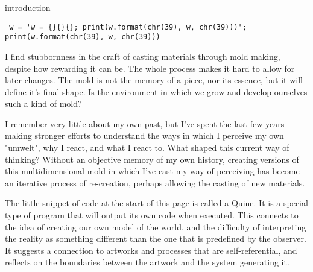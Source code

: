 
\begin{center}
\vspace*{\fill}
\Huge introduction

\vspace{2cm}

\begin{flushright}
\footnotesize 
\begin{verbatim}
 w = 'w = {}{}{}; print(w.format(chr(39), w, chr(39)))'; print(w.format(chr(39), w, chr(39)))
\end{verbatim} 
\end{flushright}
\vspace*{\fill}
\end{center}

\normalsize


I find stubbornness in the craft of casting materials through mold making, despite how rewarding it can be. The whole process makes it hard to allow for later changes. The mold is not the memory of a piece, nor its essence, but it will define it's final shape. Is the environment in which we grow and develop ourselves such a kind of mold? 

I remember very little about my own past, but I’ve spent the last few years making stronger efforts to understand the ways in which I perceive my own "umwelt", why I react, and what I react to. What shaped this current way of thinking? Without an objective memory of my own history, creating versions of this multidimensional mold in which I’ve cast my way of perceiving has become an iterative process of re-creation, perhaps allowing the casting of new materials.



The little snippet of code at the start of this page is called a Quine. It is a special type of program that will output its own code when executed. 
This connects to the idea of creating our own model of the world, and the difficulty of interpreting the reality as something different than the one that is predefined by the observer. It suggests a connection to artworks and processes that are self-referential, and reflects on the boundaries between the artwork and the system generating it.


